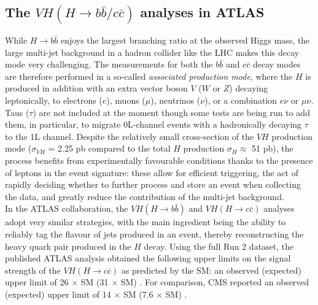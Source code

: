 \subsection{The $VH (H \rightarrow b\bar{b}/c\bar{c})$ analyses in ATLAS}
While $H \rightarrow b\bar{b}$ enjoys the largest branching ratio at the observed Higgs mass, the large multi-jet background in a hadron collider like the LHC makes this decay mode very challenging. The measurements for both the $b\bar{b}$ and $c\bar{c}$ decay modes are therefore performed in a so-called \textit{associated production mode}, where the $H$ is produced in addition with an extra vector boson $V$ ($W$ or $Z$) decaying leptonically, to electrons ($e$), muons ($\mu$), neutrinos ($\nu$), or a combination $e\nu$ or $\mu\nu$. Taus ($\tau$) are not included at the moment though some tests are being run to add them, in particular, to migrate 0L-channel events with a hadronically decaying $\tau$ to the 1L channel. Despite the relatively small cross-section of the $VH$ production mode ($\sigma_{VH}$ = 2.25 pb compared to the total $H$ production $\sigma_H \approx$ 51 pb), the process benefits from experimentally favourable conditions thanks to the presence of leptons in the event signature: these allow for efficient triggering, the act of rapidly deciding whether to further process and store an event when collecting the data, and greatly reduce the contribution of the multi-jet background. \\

In the ATLAS collaboration, the $VH (H\rightarrow b\bar{b})$ and $VH (H\rightarrow c\bar{c})$ analyses adopt very similar strategies, with the main ingredient being the ability to reliably tag the flavour of jets produced in an event, thereby reconstructing the heavy quark pair produced in the $H$ decay. Using the full Run 2 dataset, the published ATLAS analysis obtained the following upper limits on the signal strength of the $VH (H\rightarrow c\bar{c})$ as predicted by the SM: an observed (expected) upper limit of 26 $\times$ SM (31 $\times$ SM) \cite{Collaboration:2721696}. For comparison, CMS reported an observed (expected) upper limit of 14 $\times$ SM (7.6 $\times$ SM) \cite{arXiv:2205.05550}. \\ 

